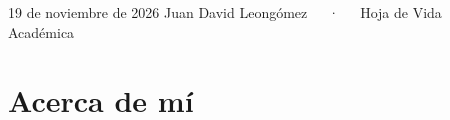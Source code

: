 \documentclass[11pt,a4paper,]{awesome-cv}
\begin{document}
\makecvheader

\makecvfooter
  {19 de noviembre de 2026}
    {Juan David Leongómez~~~·~~~Hoja de Vida Académica}
  {\thepage}





\section{Acerca de mí}\label{acerca-de-muxed}
\end{document}
